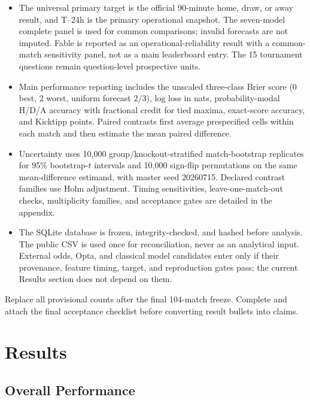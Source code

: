 \documentclass[sigconf,review]{acmart}
\newenvironment{draftbullets}
  {\begin{itemize}[leftmargin=1.25em,itemsep=1.5pt,topsep=2pt,parsep=0pt,partopsep=0pt]}
  {\end{itemize}}
\newcommand{\TODO}[1]{{\color{red}#1}}
\begin{document}
\begin{draftbullets}
  \item The universal primary target is the official 90-minute home, draw, or away result, and T--24h is
  the primary operational snapshot. The seven-model complete panel is used for common comparisons;
  invalid forecasts are not imputed. Fable is reported as an operational-reliability result with a
  common-match sensitivity panel, not as a main leaderboard entry. The 15 tournament questions remain
  question-level prospective units.

  \item Main performance reporting includes the unscaled three-class Brier score (0 best, 2 worst,
  uniform forecast $2/3$), log loss in nats, probability-modal H/D/A accuracy with fractional credit
  for tied maxima, exact-score accuracy, and Kicktipp points. Paired contrasts first average
  prespecified cells within each match and then estimate the mean paired difference.

  \item Uncertainty uses 10,000 group/knockout-stratified match-bootstrap replicates for 95\%
  bootstrap-$t$ intervals and 10,000 sign-flip permutations on the same mean-difference estimand,
  with master seed 20260715. Declared contrast families use Holm adjustment. Timing sensitivities,
  leave-one-match-out checks, multiplicity families, and acceptance gates are detailed in the
  appendix.

  \item The SQLite database is frozen, integrity-checked, and hashed before analysis. The public CSV
  is used once for reconciliation, never as an analytical input. External odds, Opta, and classical
  model candidates enter only if their provenance, feature timing, target, and reproduction gates
  pass; the current Results section does not depend on them.
\end{draftbullets}

\TODO{Replace all provisional counts after the final 104-match freeze. Complete and attach the final acceptance checklist before converting result bullets into claims.}

\section{Results}

\subsection{Overall Performance}
\end{document}
